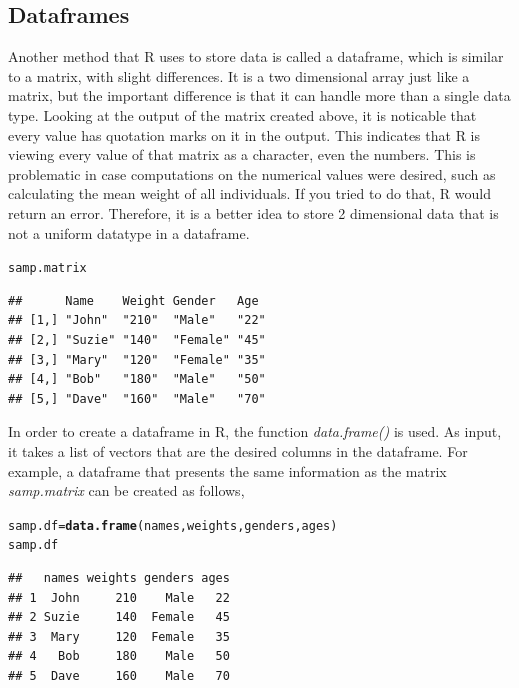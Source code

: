 \documentclass{report}\usepackage[]{graphicx}\usepackage[]{color}
\makeatletter
\newcommand{\hlstd}[1]{\textcolor[rgb]{0.345,0.345,0.345}{#1}}%
\newcommand{\hlkwb}[1]{\textcolor[rgb]{0.69,0.353,0.396}{#1}}%
\newcommand{\hlkwd}[1]{\textcolor[rgb]{0.737,0.353,0.396}{\textbf{#1}}}%
\newenvironment{kframe}{%
 \def\at@end@of@kframe{}%
 \ifinner\ifhmode%
  \def\at@end@of@kframe{\end{minipage}}%
  \begin{minipage}{\columnwidth}%
 \fi\fi%
 \def\FrameCommand##1{\hskip\@totalleftmargin \hskip-\fboxsep
 \colorbox{shadecolor}{##1}\hskip-\fboxsep
     \hskip-\linewidth \hskip-\@totalleftmargin \hskip\columnwidth}%
 \MakeFramed {\advance\hsize-\width
   \@totalleftmargin\z@ \linewidth\hsize
   \@setminipage}}%
 {\par\unskip\endMakeFramed%
 \at@end@of@kframe}
\newenvironment{knitrout}{}{} %
\makeatother
\begin{document}
\subsection{Dataframes} 
Another method that \textsf{R} uses to store data is called a dataframe, which is similar to a matrix, with slight differences.  It is a two dimensional array just like a matrix, but the important difference is that it can handle more than a single data type.  Looking at the output of the matrix created above, it is noticable that every value has quotation marks on it in the output.  This indicates that \textsf{R} is viewing every value of that matrix as a character, even the numbers.  This is problematic in case computations on the numerical values were desired, such as calculating the mean weight of all individuals.  If you tried to do that, \textsf{R} would return an error.  Therefore, it is a better idea to store 2 dimensional data that is not a uniform datatype in a dataframe.    
\begin{knitrout}
\color{fgcolor}\begin{kframe}
\begin{alltt}
\hlstd{samp.matrix}
\end{alltt}
\begin{verbatim}
##      Name    Weight Gender   Age 
## [1,] "John"  "210"  "Male"   "22"
## [2,] "Suzie" "140"  "Female" "45"
## [3,] "Mary"  "120"  "Female" "35"
## [4,] "Bob"   "180"  "Male"   "50"
## [5,] "Dave"  "160"  "Male"   "70"
\end{verbatim}
\end{kframe}
\end{knitrout}

In order to create a dataframe in \textsf{R}, the function \textit{data.frame()} is used.  As input, it takes a list of vectors that are the desired columns in the dataframe.  For example, a dataframe that presents the same information as the matrix \textit{samp.matrix} can be created as follows, 
\begin{knitrout}
\color{fgcolor}\begin{kframe}
\begin{alltt}
\hlstd{samp.df} \hlkwb{=} \hlkwd{data.frame}\hlstd{(names, weights, genders, ages)}
\hlstd{samp.df}
\end{alltt}
\begin{verbatim}
##   names weights genders ages
## 1  John     210    Male   22
## 2 Suzie     140  Female   45
## 3  Mary     120  Female   35
## 4   Bob     180    Male   50
## 5  Dave     160    Male   70
\end{verbatim}
\end{kframe}
\end{knitrout}
\end{document}
